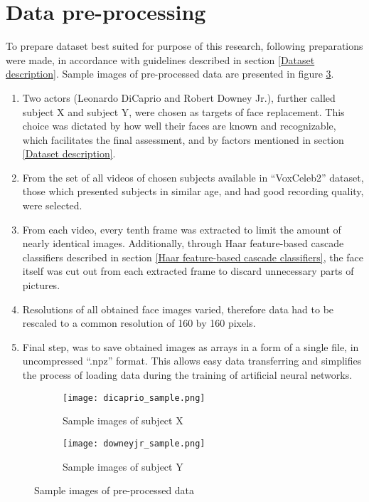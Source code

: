 \section{Data pre-processing}
\label{Data pre-processing}
To prepare dataset best suited for purpose of this research, following preparations were made, in accordance with guidelines described in section \ref{Dataset description}. Sample images of pre-processed data are presented in figure \ref{fig:subjects_sample}.

\begin{enumerate}
\item Two actors (Leonardo DiCaprio and Robert Downey Jr.), further called subject X and subject Y, were chosen as targets of face replacement. This choice was dictated by how well their faces are known and recognizable, which facilitates the final assessment, and by factors mentioned in section \ref{Dataset description}.

\item From the set of all videos of chosen subjects available in ``VoxCeleb2'' dataset, those which presented subjects in similar age, and had good recording quality, were selected.

\item From each video, every tenth frame was extracted to limit the amount of nearly identical images. Additionally, through Haar feature-based cascade classifiers described in section \ref{Haar feature-based cascade classifiers}, the face itself was cut out from each extracted frame to discard unnecessary parts of pictures.

\item Resolutions of all obtained face images varied, therefore data had to be rescaled to a common resolution of 160 by 160 pixels.

\item Final step, was to save obtained images as arrays in a form of a single file, in uncompressed ``.npz'' format. This allows easy data transferring and simplifies the process of loading data during the training of artificial neural networks.
\end{enumerate}

\begin{figure}[H]
\centering
\begin{subfigure}{.5\textwidth}
  \centering
  \texttt{[image: dicaprio\_sample.png]}
  \caption{Sample images of subject X}
  \label{subfig:subject_A_sample}
\end{subfigure}%
\begin{subfigure}{.5\textwidth}
  \centering
  \texttt{[image: downeyjr\_sample.png]}
  \caption{Sample images of subject Y}
  \label{subfig:subject_B_sample}
\end{subfigure}
\caption{Sample images of pre-processed data}
\label{fig:subjects_sample}
\end{figure}

